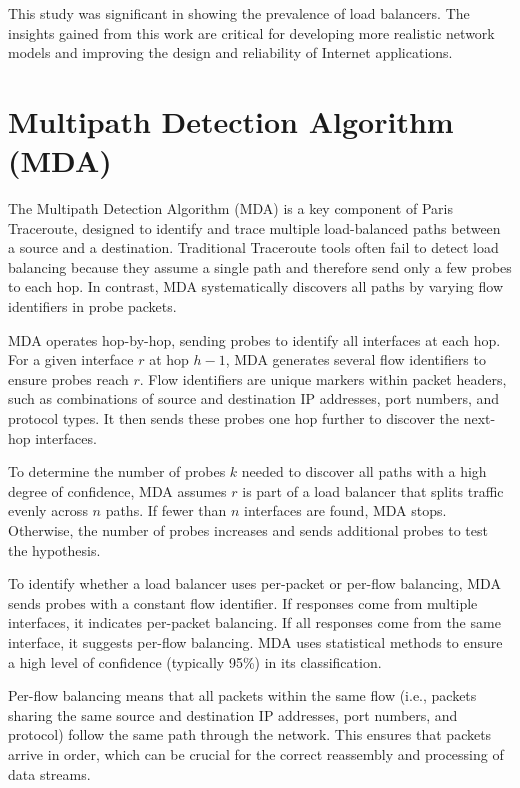 \documentclass[12pt]{cwru_thesis}
\begin{document}
This study was significant in showing the prevalence of load balancers. The insights gained from this work are critical for developing more realistic network models and improving the design and reliability of Internet applications.



\section{Multipath Detection Algorithm (MDA)}

The Multipath Detection Algorithm (MDA) \cite{4261334} is a key component of Paris Traceroute, designed to identify and trace multiple load-balanced paths between a source and a destination. Traditional Traceroute tools often fail to detect load balancing because they assume a single path and therefore send only a few probes to each hop. In contrast, MDA systematically discovers all paths by varying flow identifiers in probe packets.

MDA operates hop-by-hop, sending probes to identify all interfaces at each hop. For a given interface \(r\) at hop \(h-1\), MDA generates several flow identifiers to ensure probes reach \(r\). Flow identifiers are unique markers within packet headers, such as combinations of source and destination IP addresses, port numbers, and protocol types. It then sends these probes one hop further to discover the next-hop interfaces.

To determine the number of probes \(k\) needed to discover all paths with a high degree of confidence, MDA assumes \(r\) is part of a load balancer that splits traffic evenly across \(n\) paths. If fewer than \(n\) interfaces are found, MDA stops. Otherwise, the number of probes increases and sends additional probes to test the hypothesis.

To identify whether a load balancer uses per-packet or per-flow balancing, MDA sends probes with a constant flow identifier. If responses come from multiple interfaces, it indicates per-packet balancing. If all responses come from the same interface, it suggests per-flow balancing. MDA uses statistical methods to ensure a high level of confidence (typically 95\%) in its classification.

Per-flow balancing means that all packets within the same flow (i.e., packets sharing the same source and destination IP addresses, port numbers, and protocol) follow the same path through the network. This ensures that packets arrive in order, which can be crucial for the correct reassembly and processing of data streams.
\end{document}
